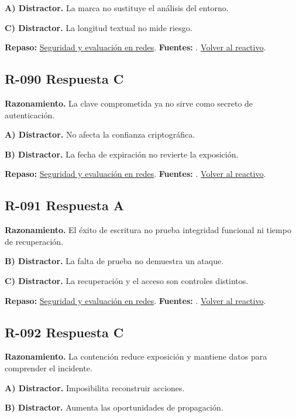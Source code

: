 \textbf{A) Distractor. }La marca no sustituye el análisis del entorno.

\textbf{C) Distractor. }La longitud textual no mide riesgo.

\textbf{Repaso:} \hyperref[sec:r3]{Seguridad y evaluación en redes}. \textbf{Fuentes:} \cite{nistsecurity,owasp,aes,tls}. \hyperref[q:R-089]{Volver al reactivo}.\par\medskip

\subsection*{R-090 \quad Respuesta C}\label{s:R-090}
\textbf{Razonamiento.} La clave comprometida ya no sirve como secreto de autenticación.

\textbf{A) Distractor. }No afecta la confianza criptográfica.

\textbf{B) Distractor. }La fecha de expiración no revierte la exposición.

\textbf{Repaso:} \hyperref[sec:r3]{Seguridad y evaluación en redes}. \textbf{Fuentes:} \cite{tls,nistsecurity}. \hyperref[q:R-090]{Volver al reactivo}.\par\medskip

\subsection*{R-091 \quad Respuesta A}\label{s:R-091}
\textbf{Razonamiento.} El éxito de escritura no prueba integridad funcional ni tiempo de recuperación.

\textbf{B) Distractor. }La falta de prueba no demuestra un ataque.

\textbf{C) Distractor. }La recuperación y el acceso son controles distintos.

\textbf{Repaso:} \hyperref[sec:r3]{Seguridad y evaluación en redes}. \textbf{Fuentes:} \cite{nistsecurity,owasp,aes,tls}. \hyperref[q:R-091]{Volver al reactivo}.\par\medskip

\subsection*{R-092 \quad Respuesta C}\label{s:R-092}
\textbf{Razonamiento.} La contención reduce exposición y mantiene datos para comprender el incidente.

\textbf{A) Distractor. }Imposibilita reconstruir acciones.

\textbf{B) Distractor. }Aumenta las oportunidades de propagación.

